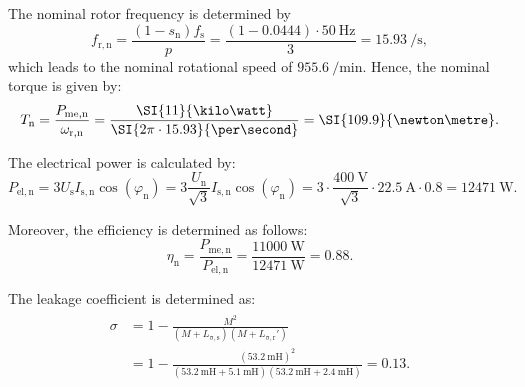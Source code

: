 \begin{solutionblock}
    The nominal rotor frequency is determined by
    $$ f_{\mathrm{r,n}} = \frac{(1-s_{\mathrm{n}})f_{\mathrm{s}}}{p} = \frac{(1-0.0444)\cdot\SI{50}{\hertz}}{3} = \SI{15.93}{\per\second},$$
    which leads to the nominal rotational speed of $\SI{955.6}{\per\minute}$. Hence, the nominal torque is given by:
    $$ T_{\mathrm{n}} = \frac{P_{\mathrm{me,n}}}{\omega_{\mathrm{r,n}}} = \frac{\SI{11}{\kilo\watt}}{\SI{2\pi\cdot 15.93}{\per\second}} = \SI{109.9}{\newton\metre}.$$
    
\end{solutionblock}



\begin{solutionblock}
    The electrical power is calculated by:
    $$ P_{\mathrm{el,n}} = 3 U_{\mathrm{s}} I_{\mathrm{s,n}} \cos(\varphi_{\mathrm{n}}) = 3 \frac{U_{\mathrm{n}}}{\sqrt{3}} I_{\mathrm{s,n}} \cos(\varphi_{\mathrm{n}}) =  3 \cdot \frac{\SI{400}{\volt}}{\sqrt{3}} \cdot \SI{22,5}{\ampere} \cdot 0.8 = \SI{12471}{\watt}.$$

    Moreover, the efficiency is determined as follows:
    $$ \eta_{\mathrm{n}} = \frac{P_{\mathrm{me,n}}}{P_{\mathrm{el,n}}} = \frac{\SI{11000}{\watt}}{\SI{12471}{\watt}} = 0.88.$$

\end{solutionblock}


\begin{solutionblock}
    The leakage coefficient is determined as:
    \begin{align*}
        \begin{split}
            \sigma &=  1 - \frac{M^2}{\left(M+L_{\mathrm{\sigma,s}}\right)\left(M+L_{\mathrm{\sigma,r}}'\right)} \\
            &= 1 - \frac{\left(\SI{53.2}{\milli\henry}\right)^2}{\left(\SI{53.2}{\milli\henry}+ \SI{5.1}{\milli\henry}\right)\left(\SI{53.2}{\milli\henry}+ \SI{2.4}{\milli\henry}\right)} = 0.13.
        \end{split}
    \end{align*}
\end{solutionblock}

